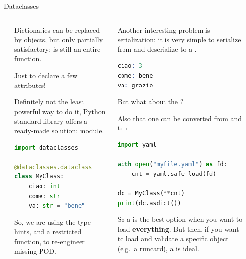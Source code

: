 \documentclass[9pt]{beamer}
\begin{document}
\begin{frame}[fragile]{Dataclasses}
    \vspace*{20pt}
    \begin{columns}
        \begin{column}{0.03\textwidth}
        \end{column}
        \begin{column}{0.47\textwidth}
            Dictionaries can be replaced by objects, but only partially
            satisfactory:  is still an entire function. 
            \begin{flushright}
                \footnotesize
                Just to declare a few attributes!
            \end{flushright}
            \vspace*{10pt}

            Definitely not the least powerful way to do it, Python standard
            library offers a ready-made solution:
            \href{https://docs.python.org/3/library/dataclasses.html}{}
            module.

            \begin{lstlisting}[language=Python,style=mystyle]
import dataclasses

@dataclasses.dataclass
class MyClass:
    ciao: int
    come: str
    va: str = "bene"\end{lstlisting}

            So, we are using the type hints, and a restricted
             function, to re-engineer missing POD.
        \end{column}
        \begin{column}{0.47\textwidth}
            Another interesting problem is serialization: it is very simple to
            serialize from and deserialize to a .

            \begin{lstlisting}[language=Prolog,style=mystyle]
ciao: 3
come: bene
va: grazie\end{lstlisting}
            
            But what about the ?

            Also that one can be converted from and to :
            \begin{lstlisting}[language=Python,style=mystyle]
import yaml

with open("myfile.yaml") as fd:
    cnt = yaml.safe_load(fd)

dc = MyClass(**cnt)
print(dc.asdict())\end{lstlisting}

            So a  is the best option when you want to load \textbf{everything}.
            But then, if you want to load and validate a specific object (e.g.\
            a runcard), a  is ideal.
        \end{column}
        \begin{column}{0.03\textwidth}
        \end{column}
    \end{columns}
\end{frame}
\end{document}
